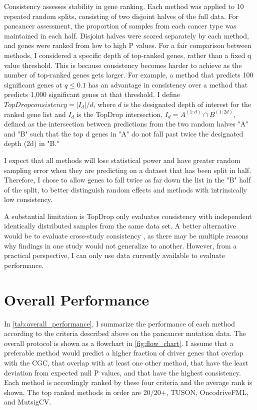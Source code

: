 Consistency assesses stability in gene ranking. Each method was applied to 10 repeated random splits, consisting of two disjoint halves of the full data. For pancancer assessment, the proportion of samples from each cancer type was maintained in each half. Disjoint halves were scored separately by each method, and genes were ranked from low to high P values. For a fair comparison between methods, I considered a specific depth of top-ranked genes, rather than a fixed q value threshold. This is because consistency becomes harder to achieve as the number of top-ranked genes gets larger. For example, a method that predicts 100 significant genes at $q \leq 0.1$ has an advantage in consistency over a method that predicts 1,000 significant genes at that threshold. I define $TopDrop consistency=|I_d |/d$, where $d$ is the designated depth of interest for the ranked gene list and $I_d$ is the TopDrop intersection, $I_d=A^{(1:d)} \cap B^{(1:2d)}$, defined as the intersection between predictions from the two random halves "A" and "B" such that the top d genes in "A" do not fall past twice the designated depth (2d) in "B."

I expect that all methods will lose statistical power and have greater random sampling error when they are predicting on a dataset that has been split in half. Therefore, I chose to allow genes to fall twice as far down the list in the "B" half of the split, to better distinguish random effects and methods with intrinsically low consistency.

A substantial limitation is TopDrop only evaluates consistency with independent identically distributed samples from the same data set. A better alternative would be to evaluate cross-study consistency \cite{RN157}, as there may be multiple reasons why findings in one study would not generalize to another. However, from a practical perspective, I can only use data currently available to evaluate performance.

\section{Overall Performance}

In \autoref{tab:overall_performance}, I summarize the performance of each method according to the criteria described above on the pancancer mutation data. The overall protocol is shown as a flowchart in \autoref{fig:flow_chart}. I assume that a preferable method would predict a higher fraction of driver genes that overlap with the CGC, that overlap with at least one other method, that have the least deviation from expected null P values, and that have the highest consistency. Each method is accordingly ranked by these four criteria and the average rank is shown. The top ranked methods in order are 20/20+, TUSON, OncodriveFML, and MutsigCV.

